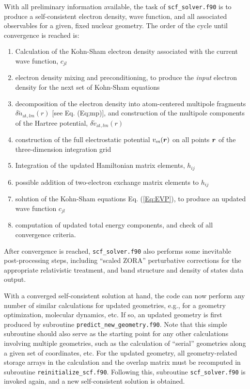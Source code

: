 With all preliminary information  available, the task of
\texttt{scf\_solver.f90} is to produce a self-consistent electron
density, wave function, and all associated observables for a given,
fixed nuclear geometry. The order of the cycle until convergence is
reached is: 
\begin{enumerate}
  \item Calculation of the Kohn-Sham electron density associated with the
    current wave function, $c_{jl}$ 
  \item electron density mixing and preconditioning, to produce the
    \emph{input} electron density for the next set of Kohn-Sham
    equations
  \item decomposition of the electron density into atom-centered
    multipole fragments $\delta\tilde{n}_{\text{at},lm}(r)$ [see
    Eq. (Eq;mp)], and construction of the multipole components of the
    Hartree potential, $\delta\tilde{v}_{\text{at},lm}(r)$
  \item construction of the full electrostatic potential
    $v_\text{es}(\mbox{\boldmath$r$})$ on all points $\mbox{\boldmath$r$}$ of the
    three-dimension integration grid
  \item Integration of the updated Hamiltonian matrix elements,
    $h_{ij}$
  \item possible addition of two-electron exchange matrix elements to
    $h_{ij}$
  \item solution of the Kohn-Sham equations Eq. (\ref{Eq:EVP}), to
    produce an updated wave function $c_{jl}$
  \item computation of updated total energy components, and check of
    all convergence criteria.  
\end{enumerate}
After convergence is reached, \texttt{scf\_solver.f90} also performs
some inevitable post-processing steps, including ``scaled ZORA''
perturbative corrections for the appropriate relativistic treatment,
and band structure and density of states data output.

With a converged self-consistent solution at hand, the code can now
perform any number of similar calculations for updated geometries,
e.g., for a geometry optimization, molecular dynamics, etc. If so, an
updated geometry is first produced by subroutine
\texttt{predict\_new\_geometry.f90}. Note that this simple subroutine
should also serve as the starting point for any other calculations
involving multiple geometries, such as the calculation of ``serial''
geometries along a given set of coordinates, etc. For the updated
geometry, all geometry-related storage arrays in the calculation and
the overlap matrix must be recomputed in subroutine
\texttt{reinitialize\_scf.f90}. Following this, subroutine
\texttt{scf\_solver.f90} is invoked again, and a new self-consistent
solution is obtained. 

